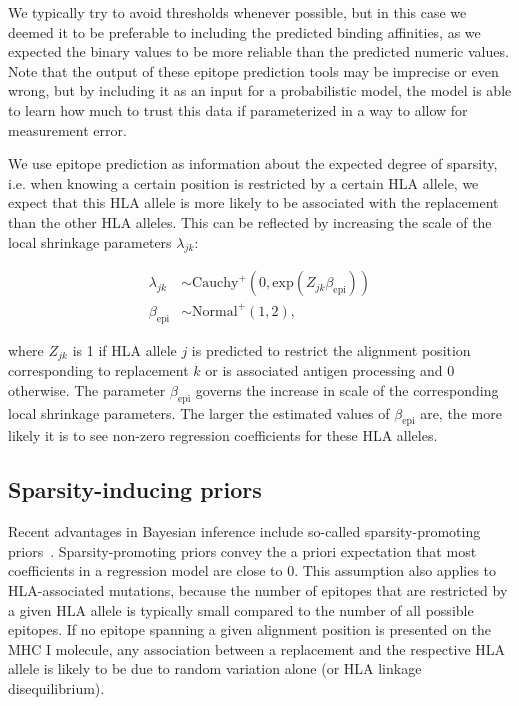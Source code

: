 \documentclass{bioinfo}
\begin{document}
\begin{methods}
We typically try to avoid thresholds whenever possible, but in this case we deemed it to be preferable to including the predicted binding affinities, as we expected the binary values to be more reliable than the predicted numeric values.
Note that the output of these epitope prediction tools may be imprecise or even wrong, but by including it as an input for a probabilistic model, the model is able to learn how much to trust this data if parameterized in a way to allow for measurement error.

We use epitope prediction as information about the expected degree of sparsity, i.e. when knowing a certain position is restricted by a certain HLA allele, we expect that this HLA allele is more likely to be associated with the replacement than the other HLA alleles.
This can be reflected by increasing the scale of the local shrinkage parameters \(\lambda_{jk}\):

\begin{equation}
  \begin{aligned}
    \lambda_{jk} &\sim \text{Cauchy}^{+}(0, \text{exp}(Z_{jk}\beta_{\text{epi}})) \\
    \beta_{\text{epi}} &\sim \text{Normal}^{+}(1, 2),
  \end{aligned}
\end{equation}
 
where \(Z_{jk}\) is 1 if HLA allele \(j\) is predicted to restrict the alignment position corresponding to replacement \(k\) or is associated antigen processing and 0 otherwise.
The parameter \(\beta_{\text{epi}}\) governs the increase in scale of the  corresponding local shrinkage parameters. The larger the estimated values of \(\beta_{\text{epi}}\) are, the more likely it is to see non-zero regression coefficients for these HLA alleles.

\subsection{Sparsity-inducing priors}
  
  Recent advantages in Bayesian inference include so-called sparsity-promoting priors~\citep{Piironen2017}. Sparsity-promoting priors convey the a priori expectation that most coefficients in a regression model are close to 0. This assumption also applies to HLA-associated mutations, because the number of epitopes that are restricted by a given HLA allele is typically small compared to the number of all possible epitopes. If no epitope spanning a given alignment position is presented on the MHC I molecule, any association between a replacement and the respective HLA allele  is likely to be due to random variation alone (or HLA linkage disequilibrium).
  

\end{methods}
\end{document}
